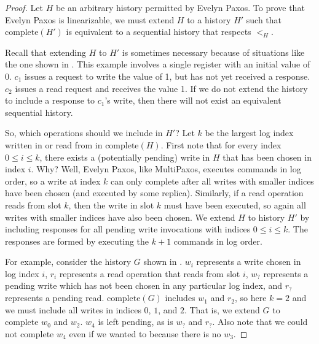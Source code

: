 \newcommand{\complete}{\text{complete}}
\begin{proof}
  Let $H$ be an arbitrary history permitted by Evelyn Paxos. To prove that
  Evelyn Paxos is linearizable, we must extend $H$ to a history $H'$ such that
  $\complete(H')$ is equivalent to a sequential history that respects $<_H$.

  Recall that extending $H$ to $H'$ is sometimes necessary because of
  situations like the one shown in . This example
  involves a single register with an initial value of 0. $c_1$ issues a request
  to write the value of 1, but has not yet received a response. $c_2$ issues a
  read request and receives the value 1. If we do not extend the history to
  include a response to $c_1$'s write, then there will not exist an equivalent
  sequential history.

  {}

  So, which operations should we include in $H'$? Let $k$ be the largest log
  index written in or read from in $\complete(H)$. First note that for every
  index $0 \leq i \leq k$, there exists a (potentially pending) write in $H$
  that has been chosen in index $i$. Why?  Well, Evelyn Paxos, like MultiPaxos,
  executes commands in log order, so a write at index $k$ can only complete
  after all writes with smaller indices have been chosen (and executed by some
  replica). Similarly, if a read operation reads from slot $k$, then the write
  in slot $k$ must have been executed, so again all writes with smaller indices
  have also been chosen.
  We extend $H$ to history $H'$ by including responses for all pending write
  invocations with indices $0 \leq i \leq k$. The responses are formed by
  executing the $k + 1$ commands in log order.

  For example, consider the history $G$ shown in . $w_i$
  represents a write chosen in log index $i$, $r_i$ represents a read operation
  that reads from slot $i$, $w_?$ represents a pending write which has not been
  chosen in any particular log index, and $r_?$ represents a pending read.
  $\complete(G)$ includes $w_1$ and $r_2$, so here $k=2$ and we must include
  all writes in indices $0$, $1$, and $2$. That is, we extend $G$ to complete
  $w_0$ and $w_2$. $w_4$ is left pending, as is $w_?$ and $r_?$. Also note
  that we could not complete $w_4$ even if we wanted to because there is no
  $w_3$.

  {}


\end{proof}
